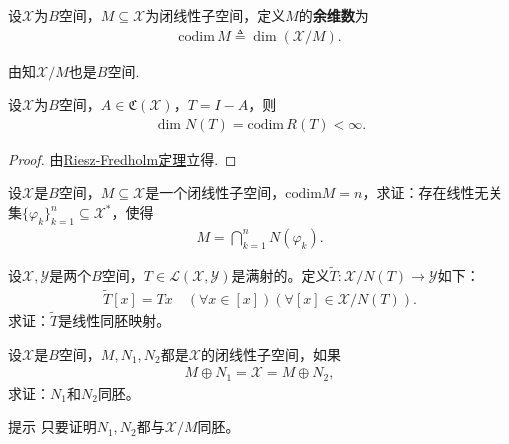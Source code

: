 \documentclass[../../main.tex]{subfiles}%
\begin{document}
\begin{definition}
设$\mathscr{X}$为$B$空间，$M\subseteq\mathscr{X}$为闭线性子空间，定义$M$的\textbf{余维数}为
\begin{align*}
\mathrm{codim}\,M\triangleq\dim(\mathscr{X}/M).
\end{align*}
\end{definition}
\begin{remark}
由知$\mathscr{X}/M$也是$B$空间.
\end{remark}

\begin{theorem}
设$\mathscr{X}$为$B$空间，$A\in\mathfrak{C}(\mathscr{X})$，$T=I-A$，则
\begin{align*}
\dim N(T)=\mathrm{codim}\,R(T)<\infty.
\end{align*}
\end{theorem}
\begin{proof}
由\hyperref[theorem:泛函分析--Riesz-Fredholm定理]{Riesz-Fredholm定理}立得.
\end{proof}

\begin{example}
设$\mathscr{X}$是$B$空间，$M \subseteq \mathscr{X}$是一个闭线性子空间，$\mathrm{codim}M = n$，求证：存在线性无关集$\{\varphi_k\}_{k=1}^{n} \subseteq \mathscr{X}^{*}$，使得
\begin{align*}
M = \bigcap\limits_{k=1}^{n} N(\varphi_k).
\end{align*}
\end{example}

\begin{example}
设$\mathscr{X},\mathscr{Y}$是两个$B$空间，$T \in \mathscr{L}(\mathscr{X},\mathscr{Y})$是满射的。定义$\widetilde{T}: \mathscr{X}/N(T) \to \mathscr{Y}$如下：
\begin{align*}
\widetilde{T}[x] = Tx \quad (\forall x \in [x])(\forall [x] \in \mathscr{X}/N(T)).
\end{align*}
求证：$\widetilde{T}$是线性同胚映射。
\end{example}

\begin{example}
设$\mathscr{X}$是$B$空间，$M,N_1,N_2$都是$\mathscr{X}$的闭线性子空间，如果
\begin{align*}
M \oplus N_1 = \mathscr{X} = M \oplus N_2,
\end{align*}
求证：$N_1$和$N_2$同胚。

提示 只要证明$N_1,N_2$都与$\mathscr{X}/M$同胚。
\end{example}
\end{document}
